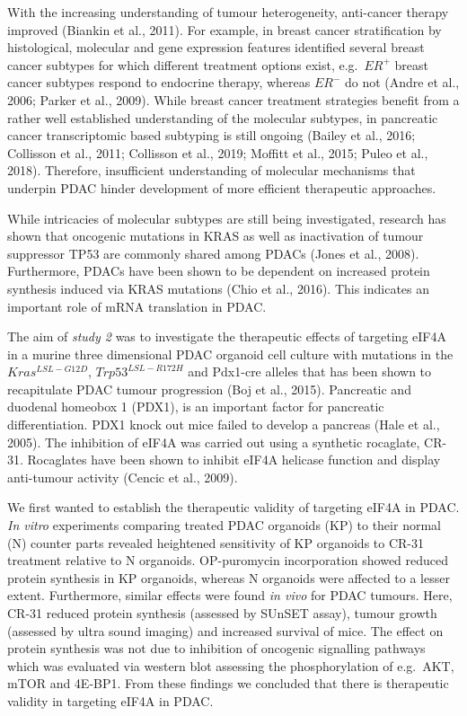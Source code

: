 \documentclass[
  12pt,
  openany]{book}
\begin{document}
With the increasing understanding of tumour heterogeneity, anti-cancer therapy improved (Biankin et al., 2011). For example, in breast cancer stratification by histological, molecular and gene expression features identified several breast cancer subtypes for which different treatment options exist, e.g.~\(ER^+\) breast cancer subtypes respond to endocrine therapy, whereas \(ER^-\) do not (Andre et al., 2006; Parker et al., 2009). While breast cancer treatment strategies benefit from a rather well established understanding of the molecular subtypes, in pancreatic cancer transcriptomic based subtyping is still ongoing (Bailey et al., 2016; Collisson et al., 2011; Collisson et al., 2019; Moffitt et al., 2015; Puleo et al., 2018). Therefore, insufficient understanding of molecular mechanisms that underpin PDAC hinder development of more efficient therapeutic approaches.

While intricacies of molecular subtypes are still being investigated, research has shown that oncogenic mutations in KRAS as well as inactivation of tumour suppressor TP53 are commonly shared among PDACs (Jones et al., 2008). Furthermore, PDACs have been shown to be dependent on increased protein synthesis induced via KRAS mutations (Chio et al., 2016). This indicates an important role of mRNA translation in PDAC.

The aim of \emph{study 2} was to investigate the therapeutic effects of targeting eIF4A in a murine three dimensional PDAC organoid cell culture with mutations in the \(Kras^{LSL-G12D}\), \(Trp53^{LSL-R172H}\) and Pdx1-cre alleles that has been shown to recapitulate PDAC tumour progression (Boj et al., 2015). Pancreatic and duodenal homeobox 1 (PDX1), is an important factor for pancreatic differentiation. PDX1 knock out mice failed to develop a pancreas (Hale et al., 2005). The inhibition of eIF4A was carried out using a synthetic rocaglate, CR-31. Rocaglates have been shown to inhibit eIF4A helicase function and display anti-tumour activity (Cencic et al., 2009).

We first wanted to establish the therapeutic validity of targeting eIF4A in PDAC. \emph{In vitro} experiments comparing treated PDAC organoids (KP) to their normal (N) counter parts revealed heightened sensitivity of KP organoids to CR-31 treatment relative to N organoids. OP-puromycin incorporation showed reduced protein synthesis in KP organoids, whereas N organoids were affected to a lesser extent. Furthermore, similar effects were found \emph{in vivo} for PDAC tumours. Here, CR-31 reduced protein synthesis (assessed by SUnSET assay), tumour growth (assessed by ultra sound imaging) and increased survival of mice. The effect on protein synthesis was not due to inhibition of oncogenic signalling pathways which was evaluated via western blot assessing the phosphorylation of e.g.~AKT, mTOR and 4E-BP1. From these findings we concluded that there is therapeutic validity in targeting eIF4A in PDAC.
\end{document}
